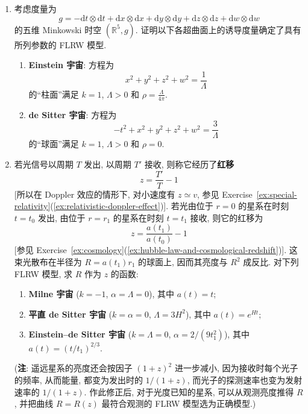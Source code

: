 \begin{RiemannExercise}
\begin{enumerate}[label=(\arabic*),ref=\arabic*,leftmargin=*]
(\textbf{注}: 目前认为, 确实存在正的宇宙学常数, 也称为\textbf{暗能量}. 实验观测所支持的模型似乎是 $k=0$, $\Lambda>0$.)
\item\label{ex:einstein-and-de-sitter-universe-embeddings}
考虑度量为
\[
  g=-\mathrm{d}t\otimes\mathrm{d}t+\mathrm{d}x\otimes\mathrm{d}x
    +\mathrm{d}y\otimes\mathrm{d}y+\mathrm{d}z\otimes\mathrm{d}z+\mathrm{d}w\otimes\mathrm{d}w
\]
的五维 Minkowski 时空 $(\mathbb{R}^5,g)$. 证明以下各超曲面上的诱导度量确定了具有所列参数的 FLRW 模型.
\begin{enumerate}[label=(\alph*),leftmargin=*]
\item \textbf{Einstein 宇宙}: 方程为
\[
  x^2+y^2+z^2+w^2=\frac{1}{\Lambda}
\]
的\textquotedblleft 柱面\textquotedblright 满足 $k=1$, $\Lambda>0$ 和 $\rho=\frac{\Lambda}{4\pi}$.
\item \textbf{de Sitter 宇宙}: 方程为
\[
  -t^2+x^2+y^2+z^2+w^2=\frac{3}{\Lambda}
\]
的\textquotedblleft 球面\textquotedblright 满足 $k=1$, $\Lambda>0$ 和 $\rho=0$.
\end{enumerate}
\item\label{ex:flrw-brightness-and-redshift}
若光信号以周期 $T$ 发出, 以周期 $T'$ 接收, 则称它经历了\textbf{红移}
\[
  z=\frac{T'}{T}-1
\]
[所以在 Doppler 效应的情形下, 对小速度有 $z\simeq v$, 参见 Exercise~\ref{ex:special-relativity}(\ref{ex:relativistic-doppler-effect})]. 若光由位于 $r=0$ 的星系在时刻 $t=t_0$ 发出, 由位于 $r=r_1$ 的星系在时刻 $t=t_1$ 接收, 则它的红移为
\[
  z=\frac{a(t_1)}{a(t_0)}-1
\]
[参见 Exercise~\ref{ex:cosmology}(\ref{ex:hubble-law-and-cosmological-redshift})]. 这束光散布在半径为 $R=a(t_1)r_1$ 的球面上, 因而其亮度与 $R^2$ 成反比. 对下列 FLRW 模型, 求 $R$ 作为 $z$ 的函数:
\begin{enumerate}[label=(\alph*),leftmargin=*]
\item \textbf{Milne 宇宙} ($k=-1$, $\alpha=\Lambda=0$), 其中 $a(t)=t$;
\item \textbf{平直 de Sitter 宇宙} ($k=\alpha=0$, $\Lambda=3H^2$), 其中 $a(t)=e^{Ht}$;
\item \textbf{Einstein–de Sitter 宇宙} ($k=\Lambda=0$, $\alpha=2/(9t_1^2)$), 其中 $a(t)=(t/t_1)^{2/3}$.
\end{enumerate}
(\textbf{注}: 遥远星系的亮度还会按因子 $(1+z)^2$ 进一步减小, 因为接收时每个光子的频率, 从而能量, 都变为发出时的 $1/(1+z)$, 而光子的探测速率也变为发射速率的 $1/(1+z)$. 作此修正后, 对于光度已知的星系, 可以从观测亮度推得 $R$, 并把曲线 $R=R(z)$ 最符合观测的 FLRW 模型选为正确模型.)
\end{enumerate}
\end{RiemannExercise}
